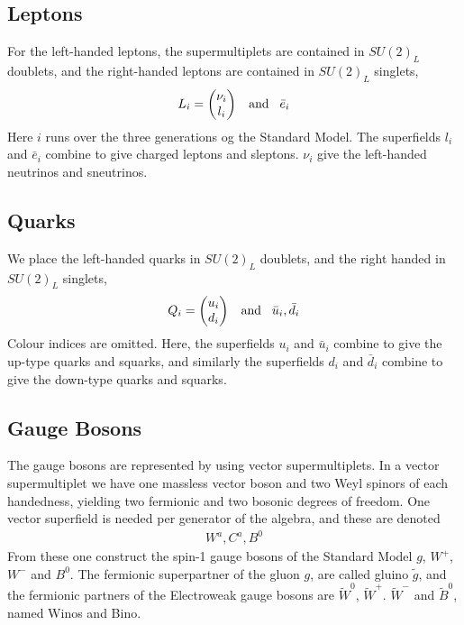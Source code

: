 \subsection{Leptons}
For the left-handed leptons, the supermultiplets are contained in $SU(2)_{L}$ doublets, and the right-handed leptons are contained in $SU(2)_{L}$ singlets,
\begin{align}
    L_{i}=\begin{pmatrix}
            \nu_i\\
            l_i
\end{pmatrix}\hspace{3mm}\text{and}\hspace{3mm}\bar{e}_{i}
\end{align}
Here $i$ runs over the three generations og the Standard Model. The superfields $l_i$ and $\bar{e}_i$ combine to give charged leptons and sleptons. $\nu_{i}$ give the left-handed neutrinos and sneutrinos.

\subsection{Quarks}
We place the left-handed quarks in $SU(2)_{L}$ doublets, and the right handed in $SU(2)_{L}$ singlets,
\begin{align}
    Q_{i}=\begin{pmatrix}
            u_i\\
            d_i
\end{pmatrix}\hspace{3mm}\text{and}\hspace{3mm}\bar{u}_{i},\bar{d}_{i}
\end{align}
Colour indices are omitted. Here, the superfields $u_{i}$ and $\bar{u}_{i}$ combine to give the up-type quarks and squarks, and similarly the superfields $d_{i}$ and $\bar{d}_{i}$ combine to give the down-type quarks and squarks.

\subsection{Gauge Bosons}
The gauge bosons are represented by using vector supermultiplets. In a vector supermultiplet we have one massless vector boson and two Weyl spinors of each handedness, yielding two fermionic and two bosonic degrees of freedom. One vector superfield is needed per generator of the algebra, and these are denoted
\begin{align}
    W^{a},C^{a},B^{0}
\end{align}
From these one construct the spin-1 gauge bosons of the Standard Model $g$, $W^{+}$,$W^{-}$ and $B^{0}$. The fermionic superpartner of the gluon $g$, are called gluino $\tilde{g}$, and the fermionic partners of the Electroweak gauge bosons are $\tilde{W}^{0}$, $\tilde{W}^{+}$. $\tilde{W}^{-}$ and $\tilde{B}^{0}$, named Winos and Bino.

